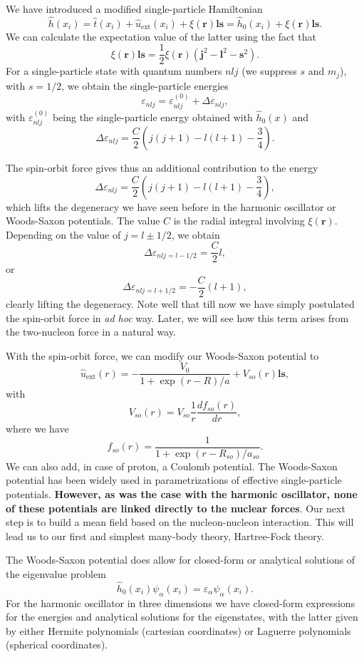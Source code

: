 \documentclass[%
twoside,                 %
final,                   %
10pt]{article}
\begin{document}
We have introduced a modified single-particle Hamiltonian
\[
\hat{h}(x_i) =  \hat{t}(x_i) + \hat{u}_{\mathrm{ext}}(x_i) +\xi(\bm{r})\bm{ls}=\hat{h}_0(x_i)+\xi(\bm{r})\bm{ls}. 
\]
We can calculate the expectation value of the latter using the fact that
\[
\xi(\bm{r})\bm{ls}=\frac{1}{2}\xi(\bm{r})\left(\bm{j}^2-\bm{l}^2-\bm{s}^2\right).
\]
For a single-particle state with quantum numbers $nlj$ (we suppress $s$ and $m_j$), with $s=1/2$, we obtain the single-particle energies
\[
\varepsilon_{nlj} = \varepsilon_{nlj}^{(0)}+\Delta\varepsilon_{nlj}, 
\]
with $\varepsilon_{nlj}^{(0)}$ being the single-particle energy obtained with $\hat{h}_0(x)$ and
\[
\Delta\varepsilon_{nlj}=\frac{C}{2}\left(j(j+1)-l(l+1)-\frac{3}{4}\right).
\]


The spin-orbit force gives thus an additional contribution to the energy
\[
\Delta\varepsilon_{nlj}=\frac{C}{2}\left(j(j+1)-l(l+1)-\frac{3}{4}\right),
\]
which lifts the degeneracy we have seen before in the harmonic oscillator or Woods-Saxon potentials. The value $C$ is the radial
integral involving $\xi(\bm{r})$. Depending on the value of $j=l\pm 1/2$, we obtain 
\[
\Delta\varepsilon_{nlj=l-1/2}=\frac{C}{2}l,
\]
or
\[
\Delta\varepsilon_{nlj=l+1/2}=-\frac{C}{2}(l+1),
\]
clearly lifting the degeneracy. Note well that till now we have simply postulated the spin-orbit force in \emph{ad hoc} way.
Later, we will see how this term arises from the two-nucleon force in a natural way. 


With the spin-orbit force, we can modify our Woods-Saxon potential to 
\[
\hat{u}_{\mathrm{ext}}(r)=-\frac{V_0}{1+\exp{(r-R)/a}}+V_{so}(r)\bm{ls},
\]
with
\[
V_{so}(r) = V_{so}\frac{1}{r}\frac{d f_{so}(r)}{dr},
\]
where we have 
\[
f_{so}(r) = \frac{1}{1+\exp{(r-R_{so})/a_{so}}}.
\]
We can also add, in case of proton, a Coulomb potential. The Woods-Saxon potential has been widely used in parametrizations of
effective single-particle potentials. \textbf{However, as was the case with the harmonic oscillator, none of these potentials are linked directly to the nuclear forces}. Our next step is to build a mean field based on the nucleon-nucleon interaction.
This will lead us to our first and simplest many-body theory, Hartree-Fock theory.  


The Woods-Saxon potential does allow for closed-form or analytical solutions of the eigenvalue problem
\[
  \hat{h}_0(x_i)\psi_{\alpha}(x_i)=\varepsilon_{\alpha}\psi_{\alpha}(x_i).  
\]
For the harmonic oscillator in three dimensions we have closed-form expressions for the energies and analytical solutions for the eigenstates,
with the latter given by either Hermite polynomials (cartesian coordinates) or Laguerre polynomials (spherical coordinates).
\end{document}
